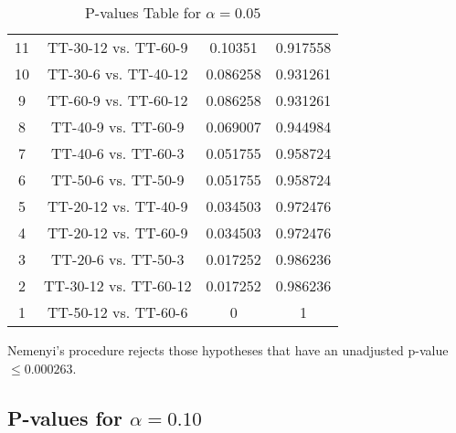 \documentclass[a4paper,10pt]{article}
\begin{document}
\begin{landscape}
\begin{table}[!htp]
\begin{tabular}{cccc}
11&TT-30-12 vs. TT-60-9&0.10351&0.917558\\
10&TT-30-6 vs. TT-40-12&0.086258&0.931261\\
9&TT-60-9 vs. TT-60-12&0.086258&0.931261\\
8&TT-40-9 vs. TT-60-9&0.069007&0.944984\\
7&TT-40-6 vs. TT-60-3&0.051755&0.958724\\
6&TT-50-6 vs. TT-50-9&0.051755&0.958724\\
5&TT-20-12 vs. TT-40-9&0.034503&0.972476\\
4&TT-20-12 vs. TT-60-9&0.034503&0.972476\\
3&TT-20-6 vs. TT-50-3&0.017252&0.986236\\
2&TT-30-12 vs. TT-60-12&0.017252&0.986236\\
1&TT-50-12 vs. TT-60-6&0&1\\
\hline
\end{tabular}
\caption{P-values Table for $\alpha=0.05$}
\end{table}Nemenyi's procedure rejects those hypotheses that have an unadjusted p-value $\le0.000263$.

\pagebreak

\subsection{P-values for $\alpha=0.10$}


\end{landscape}
\end{document}

